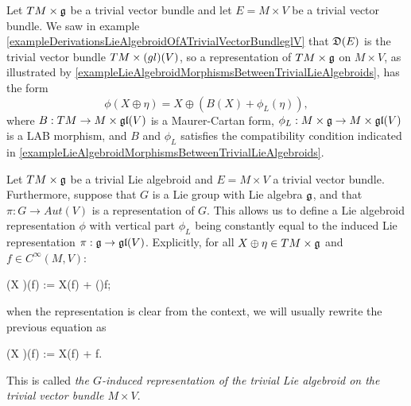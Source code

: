 \begin{example}
\label{exampleAllRepresentationsofTLAoverTrivialVectorbundle}
Let $TM \times \mathfrak{g}$ be a trivial vector bundle and let $E = M \times V$ be a trivial vector bundle. We saw in example \ref{exampleDerivationsLieAlgebroidOfATrivialVectorBundleglV} that $\mathfrak{D}(E)$ is the trivial vector bundle $TM \times \mathfrak{(}gl)(V)$, so a representation of $TM \times \mathfrak{g}$ on $M \times V$, as illustrated by \ref{exampleLieAlgebroidMorphismsBetweenTrivialLieAlgebroids}, has the form
\begin{equation}
    \phi(X \oplus \eta) = X \oplus(B(X) + \phi_L(\eta)),
\end{equation}
where $B: TM \to M\times \mathfrak{gl}(V)$ is a Maurer-Cartan form, $\phi_L: M \times \alg g \to M \times \alg{gl}(V)$ is a LAB morphism, and $B$ and $\phi_L$ satisfies the compatibility condition indicated in \ref{exampleLieAlgebroidMorphismsBetweenTrivialLieAlgebroids}.
\end{example}


\begin{example}
\label{definitionExampleGroupInducedRepresentationTrivialLieAlgebroidTLAOnTrivialVectorBundle}
Let $TM \times \mathfrak{g}$ be a trivial Lie algebroid and $E = M \times V$ a trivial vector bundle. Furthermore, suppose that $G$ is a Lie group with Lie algebra $\mathfrak{g}$, and that $\pi: G \to Aut(V)$ is a representation of $G$. This allows us to define a Lie algebroid representation $\phi$ with vertical part $\phi_L$ being constantly equal to the induced Lie representation $\pi: \mathfrak{g} \to \mathfrak{gl}(V)$. Explicitly, for all $X \oplus \eta \in TM \times \mathfrak{g}$ and $f \in C^\infty(M, V)$:
\begin{eqnsplit}\label{equationGroupInducedRepresentationInTrivialAlgebroids}
    \phi(X \oplus \eta)(f) := X(f) + \pi(\eta)f;
\end{eqnsplit}
when the representation is clear from the context, we will usually rewrite the previous equation as
\begin{eqnsplit}\label{equationGroupInducedRepresentationInTrivialAlgebroids}
    \phi(X \oplus \eta)(f) := X(f) + \eta \cdot f.
\end{eqnsplit}
This is called \emph{the $G$-induced representation of the trivial Lie algebroid on the trivial vector bundle $M\times V$}.
\end{example}

